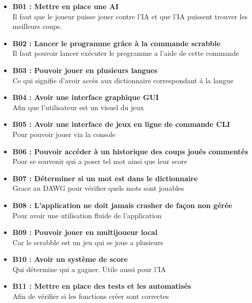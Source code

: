 \documentclass[a4paper,12pt]{article}
\begin{document}
\begin{itemize}
    \item \textbf {B01 : Mettre en place une AI}\\ Il faut que le joueur puisse jouer contre l'IA et que l'IA puissent trouver les meilleurs coups. \\
    \item \textbf {B02 : Lancer le programme grâce à la commande scrabble}\\ Il faut pouvoir lancer exécuter le programme a l'aide de cette commande \\
    \item \textbf {B03 : Pouvoir jouer en plusieurs langues}\\ Ce qui signifie d'avoir accès aux dictionnaire correspondant à la langue \\
    \item \textbf {B04 : Avoir une interface graphique GUI}\\ Afin que l'utilisateur est un visuel du jeux \\ 
    \item \textbf {B05 : Avoir une interface de jeux en ligne de commande CLI}\\ Pour pouvoir jouer via la console \\
    \item \textbf {B06 : Pouvoir accéder à un historique des coups joués commentés}\\ Pour se souvenir qui a poser tel mot ainsi que leur score \\
    \item \textbf {B07 : Déterminer si un mot est dans le dictionnaire}\\ Grace au DAWG pour vérifier quels mots sont jouables \\
    \item \textbf {B08 : L’application ne doit jamais crasher de façon non gérée}\\ Pour avoir une utilisation fluide de l’application \\
    \item \textbf {B09 : Pouvoir jouer en multijoueur local}\\ Car le scrabble est un jeu qui se joue a plusieurs \\
    \item \textbf {B10 : Avoir un système de score}\\ Qui détermine qui a gagner. Utile aussi pour l'IA \\
    \item \textbf {B11 : Mettre en place des tests et les automatisés}\\ Afin de vérifier si les fonctions créer sont correctes \\

\end{itemize}
\end{document}
